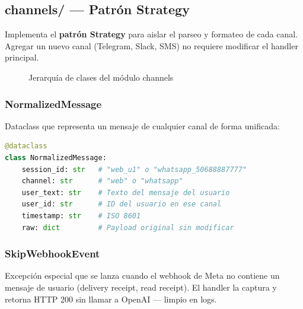 \documentclass[12pt,a4paper]{article}
\begin{document}
\subsection{channels/ — Patrón Strategy}

Implementa el \textbf{patrón Strategy} para aislar el parseo y formateo de cada canal.
Agregar un nuevo canal (Telegram, Slack, SMS) no requiere modificar el handler principal.

\begin{figure}[H]
\centering
{}
\caption{Jerarquía de clases del módulo channels}
\end{figure}

\subsubsection*{NormalizedMessage}

Dataclass que representa un mensaje de cualquier canal de forma unificada:

\begin{lstlisting}[language=Python, caption={NormalizedMessage dataclass}]
@dataclass
class NormalizedMessage:
    session_id: str   # "web_u1" o "whatsapp_50688887777"
    channel: str      # "web" o "whatsapp"
    user_text: str    # Texto del mensaje del usuario
    user_id: str      # ID del usuario en ese canal
    timestamp: str    # ISO 8601
    raw: dict         # Payload original sin modificar
\end{lstlisting}

\subsubsection*{SkipWebhookEvent}

Excepción especial que se lanza cuando el webhook de Meta no contiene un mensaje
de usuario (delivery receipt, read receipt). El handler la captura y retorna
HTTP 200 sin llamar a OpenAI — limpio en logs.
\end{document}
